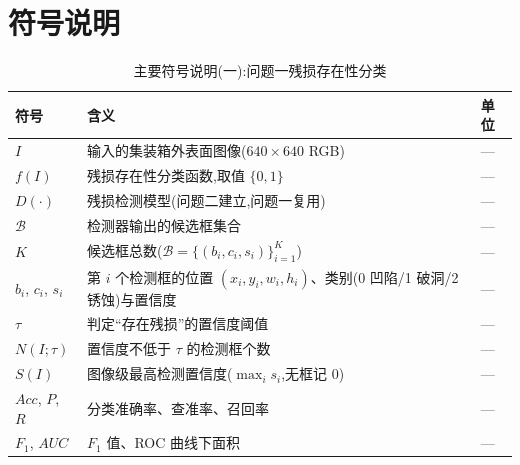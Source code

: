 %
\section{符号说明}

\begin{table}[H]
\centering
\small
\renewcommand{\arraystretch}{1.0}
\setlength{\tabcolsep}{2.5pt}
\caption{主要符号说明(一):问题一残损存在性分类}
\begin{tabular}{p{3.2cm}p{10.0cm}p{1.3cm}}
\toprule
符号 & 含义 & 单位 \\
\midrule
$I$ & 输入的集装箱外表面图像($640\times640$ RGB) & — \\
$f(I)$ & 残损存在性分类函数,取值 $\{0,1\}$ & — \\
$D(\cdot)$ & 残损检测模型(问题二建立,问题一复用) & — \\
$\mathcal{B}$ & 检测器输出的候选框集合 & — \\
$K$ & 候选框总数($\mathcal{B}=\{(b_i,c_i,s_i)\}_{i=1}^{K}$) & — \\
$b_i$, $c_i$, $s_i$ & 第 $i$ 个检测框的位置 $(x_i,y_i,w_i,h_i)$、类别(0 凹陷/1 破洞/2 锈蚀)与置信度 & — \\
$\tau$ & 判定“存在残损”的置信度阈值 & — \\
$N(I;\tau)$ & 置信度不低于 $\tau$ 的检测框个数 & — \\
$S(I)$ & 图像级最高检测置信度($\max_i s_i$,无框记 0) & — \\
$Acc$, $P$, $R$ & 分类准确率、查准率、召回率 & — \\
$F_1$, $AUC$ & $F_1$ 值、ROC 曲线下面积 & — \\
\bottomrule
\end{tabular}
\end{table}

